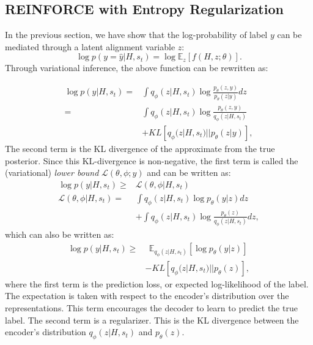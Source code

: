 \documentclass[letterpaper]{article} \usepackage{aaai19}  \usepackage{times}  \usepackage{helvet}  \usepackage{courier}  \usepackage{url}  \usepackage{graphicx}  \usepackage{amsmath}
\begin{document}
\subsection{REINFORCE with Entropy Regularization}
In the previous section, we have show that the log-probability of label $y$ can be mediated through a latent alignment variable $z$:
\begin{equation}
\log p(y=\hat{y}|H, s_t) = \log \mathbb{E}_{z}[f(H,z;\theta)].
\end{equation}
Through variational inference, the above function can be rewritten as:


\begin{equation}
\begin{aligned}
\log p(y|H,s_t) =& \int q_\phi(z|H,s_t)\log \frac{p_\theta(z,y)}{p_\theta(z|y)} dz\\
=& \int q_\phi(z|H,s_t)\log\frac{p_\theta(z,y)}{q_\phi(z|H,s_t)} \\
&+ KL[q_\phi(z|H,s_t)||p_\theta(z|y)],
\end{aligned}
\end{equation}
The second term is the KL divergence of the approximate from the true posterior. Since this KL-divergence is non-negative, the first term is called the (variational) \textit{lower bound} $\mathcal{L}(\theta, \phi; y)$ and can be written as:
\begin{equation}
\begin{aligned}
\log p(y|H,s_t) \geq &\mathcal{L}(\theta,\phi|H,s_t)\\
\mathcal{L}(\theta,\phi|H,s_t) = & \int q_\phi(z|H,s_t)\log p_\theta(y|z)dz\\
& +\int q_\phi(z|H,s_t)\log \frac{p_\theta(z)}{q_\phi(z|H,s_t)}dz, 
\end{aligned}
\end{equation}
which can also be written as:
\begin{equation}
\begin{aligned}
\log p(y|H,s_t) \geq  & \ \  \mathbb{E}_{q_\phi(z|H,s_t)}[\log p_\theta(y|z)]\\
&-KL[q_\phi(z|H,s_t)||p_\theta(z)],
 \end{aligned}
\end{equation}
where the first term is the prediction loss, or expected log-likelihood of the label. The expectation is taken with respect to the encoder’s distribution over the representations. This term encourages the decoder to learn to predict the true label. The second term is a regularizer. This is the KL divergence between the encoder’s distribution $q_\phi(z|H,s_t)$ and $p_\theta(z)$.
\end{document}
